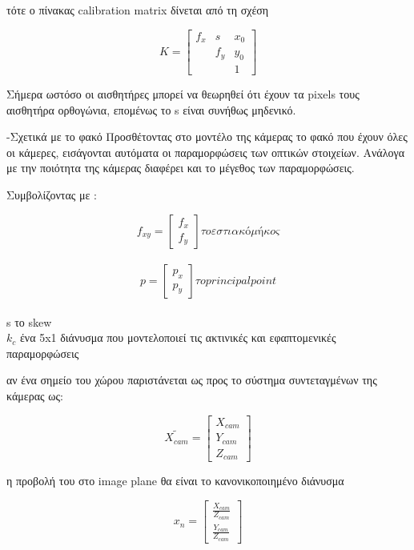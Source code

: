 τότε ο πίνακας calibration matrix δίνεται από τη σχέση 


\begin{equation}
Κ=
\begin{bmatrix}
f_{x} & s & x_{0}\\
 & f_{y} & y_{0}\\
 & & 1
\end{bmatrix}
\end{equation}


Σήμερα ωστόσο οι αισθητήρες μπορεί να θεωρηθεί ότι έχουν τα pixels τους αισθητήρα ορθογώνια, επομένως το s είναι συνήθως μηδενικό. 


-Σχετικά με το φακό
Προσθέτοντας στο μοντέλο της κάμερας το φακό που έχουν όλες οι κάμερες, εισάγονται αυτόματα οι παραμορφώσεις των οπτικών στοιχείων. Ανάλογα με την ποιότητα της κάμερας διαφέρει και το μέγεθος των παραμορφώσεις.

Συμβολίζοντας με :

\begin{equation}
f_{xy}=
\begin{bmatrix}
f_{x}\\
f_{y}
\end{bmatrix} το εστιακό μήκος
\end{equation}
\\
\begin{equation}
p=
\begin{bmatrix}
p_{x}\\
p_{y}
\end{bmatrix} το principal point
\end{equation}
\\
s το skew\\
$k_{c}$ ένα 5x1 διάνυσμα που μοντελοποιεί τις ακτινικές και εφαπτομενικές παραμορφώσεις

αν ένα σημείο του χώρου παριστάνεται ως προς το σύστημα συντεταγμένων της κάμερας ως:

\begin{equation}
\tilde{X_{cam}}=
\begin{bmatrix}
X_{cam}\\
Y_{cam}\\
Z_{cam}
\end{bmatrix}
\end{equation}

η προβολή του στο image plane θα είναι το κανονικοποιημένο διάνυσμα 

\begin{equation}
x_{n}=
\begin{bmatrix}
\frac{X_{cam}}{Z_{cam}}\\
\frac{Y_{cam}}{Z_{cam}}
\end{bmatrix}
\end{equation}

